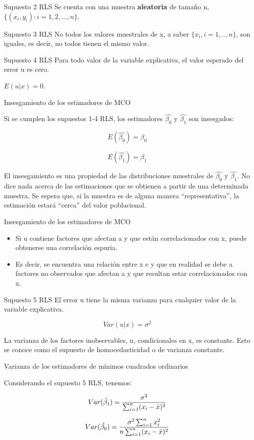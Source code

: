 \documentclass{beamer}
\begin{document}
\begin{frame}{Supuesto 2 RLS}
    Se cuenta con una muestra {\bf aleatoria} de tamaño n, $\lbrace(x_i,y_i): i = 1, 2, ..., n\rbrace$.


\end{frame}

\begin{frame}{Supuesto 3 RLS}
    No todos los valores muestrales de x, a saber $\lbrace x_i, i = 1,.., n\rbrace$, son iguales, es decir, no todos tienen
el mismo valor.
\end{frame}

\begin{frame}{Supuesto 4 RLS}
    Para todo valor de la variable explicativa, el valor esperado del error u es cero. 
    
$E(u|x) = 0$.
\end{frame}


\begin{frame}{Insesgamiento de los estimadores de MCO}


    Si se cumplen los supuestos 1-4 RLS, los estimadores $\hat{\beta_0}$ y $\hat{\beta_1}$ son insesgados:


$$E(\hat{\beta_0})=\beta_0$$

$$E(\hat{\beta_1})=\beta_1$$

El insesgamiento es una propiedad de las distribuciones muestrales de $\hat{\beta_0}$ y $\hat{\beta_1}$.
No dice nada acerca de las estimaciones que se obtienen a partir de una determinada
muestra. Se espera que, si la muestra es de alguna manera “representativa”, la estimación estará “cerca” del valor poblacional.
     
\end{frame}


\begin{frame}{Insesgamiento de los estimadores de MCO}
    
    \begin{itemize}
        \item Si u contiene factores que afectan a y  que están
correlacionados con x, puede obtenerse una {\color{blue} correlación espuria}.
\item Es decir, se encuentra
una relación entre  x e y que en realidad se debe a factores no observados que afectan a y  que
resultan estar correlacionados con x.
    \end{itemize}


\end{frame}


\begin{frame}{Supuesto 5 RLS}
    El error u tiene la misma varianza para cualquier valor de la variable explicativa. 
    
$$Var(u|x)=\sigma^2$$

La varianza de los
factores inobservables, u, condicionales en x, es constante. Esto se conoce como el supuesto de {\color{blue}
homocedasticidad o de varianza constante.}
\end{frame}

\begin{frame}{Varianza de los estimadores de mínimos cuadrados ordinarios}

Considerando el supuesto 5 RLS, tenemos:

$$Var(\hat{\beta_1})={\sigma^2\over \sum_{i=1}^n(x_i-\bar{x})^2} $$

$$Var(\hat{\beta_0})={\sigma^2 \sum_{i=1}^nx_i^2\over n\sum_{i=1}^n(x_i-\bar{x})^2 }$$

    
\end{frame}
\end{document}
